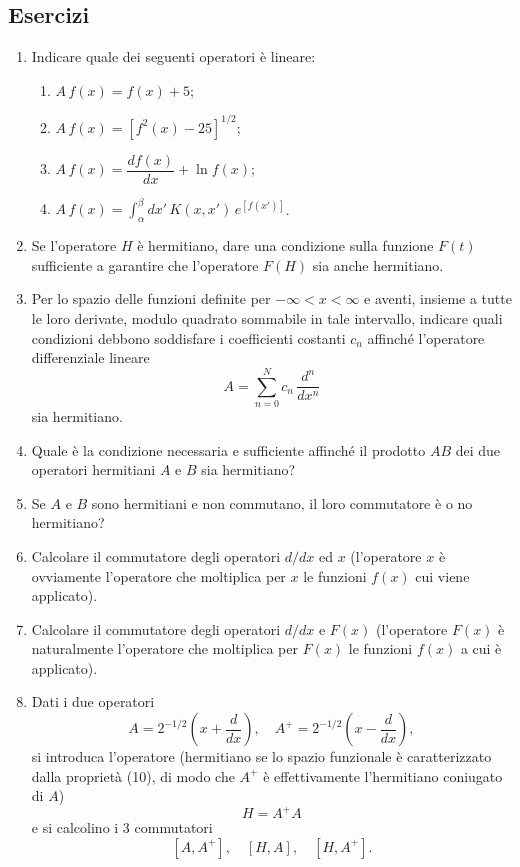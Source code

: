 \documentclass[11pt, a4paper]{book}
\numberwithin{equation}{section}
\newenvironment{esercizi}{\subsection*{Esercizi}\begin{enumerate}}{\end{enumerate}}
\begin{document}
\begin{esercizi}

\item Indicare quale dei seguenti operatori è lineare:
\begin{enumerate}
  \item $A\,f(x) = f(x) + 5$;


  \item $A\,f(x) = [f^2(x)-25]^{1/2}$;
  \item $A\,f(x) = \dfrac{df(x)}{dx} + \ln f(x)$;
  \item $A\,f(x) = \int_\alpha^\beta dx'\,K(x,x')\,e^{[f(x')]}$.
\end{enumerate}

\item Se l'operatore $H$ è hermitiano, dare una condizione sulla
funzione $F(t)$ sufficiente a garantire che l'operatore $F(H)$ sia
anche hermitiano.

\item Per lo spazio delle funzioni definite per $-\infty < x < \infty$
e aventi, insieme a tutte le loro derivate, modulo quadrato sommabile
in tale intervallo, indicare quali condizioni debbono soddisfare i
coefficienti costanti $c_n$ affinché l'operatore differenziale lineare
\[
A = \sum_{n=0}^{N} c_n\,\frac{d^n}{dx^n}
\]
sia hermitiano.

\item Quale è la condizione necessaria e sufficiente affinché il
prodotto $AB$ dei due operatori hermitiani $A$ e $B$ sia hermitiano?

\item Se $A$ e $B$ sono hermitiani e non commutano, il loro commutatore
è o no hermitiano?

\item Calcolare il commutatore degli operatori $d/dx$ ed $x$ (l'operatore
$x$ è ovviamente l'operatore che moltiplica per $x$ le funzioni $f(x)$
cui viene applicato).

\item Calcolare il commutatore degli operatori $d/dx$ e $F(x)$
(l'operatore $F(x)$ è naturalmente l'operatore che moltiplica per $F(x)$
le funzioni $f(x)$ a cui è applicato).

\item Dati i due operatori
\[
A = 2^{-1/2}\left(x+\frac{d}{dx}\right), \quad
A^+ = 2^{-1/2}\left(x-\frac{d}{dx}\right),
\]
si introduca l'operatore (hermitiano se lo spazio funzionale è
caratterizzato dalla proprietà (10), di modo che $A^+$ è effettivamente
l'hermitiano coniugato di $A$)
\[
H = A^+A
\]
e si calcolino i 3 commutatori
\[
[A, A^+], \quad [H, A], \quad [H, A^+].
\]


\end{esercizi}
\end{document}
